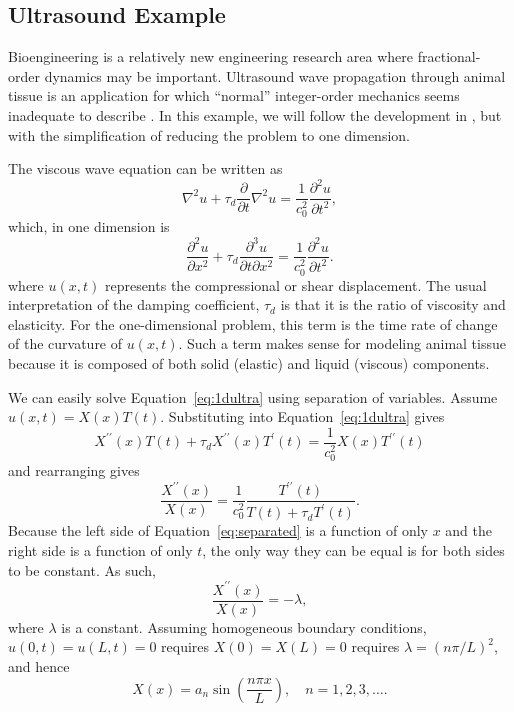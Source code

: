 \subsection{Ultrasound Example}

Bioengineering is a relatively new engineering research area where fractional-order dynamics may be important. Ultrasound wave propagation through animal tissue is an application for which ``normal'' integer-order mechanics seems inadequate to describe \cite{holm}. In this example, we will follow the development in \cite{holm}, but with the simplification of reducing the problem to one dimension.

The viscous wave equation can be written as
\begin{equation}
\nabla^2 u + \tau_d \frac{\partial}{\partial t} \nabla^2 u = \frac{1}{c_0^2} \frac{\partial^2 u}{\partial t^2},
\end{equation}
which, in one dimension is
\begin{equation}
\frac{\partial^2 u}{\partial x^2} + \tau_d \frac{\partial^3 u}{\partial t \partial x^2} =  \frac{1}{c_0^2} \frac{\partial^2 u}{\partial t^2}.
\label{eq:1dultra}
\end{equation}
where $u(x,t)$ represents the compressional or shear displacement. The usual interpretation of the damping coefficient, $\tau_d$ is that it is the ratio of viscosity and elasticity. For the one-dimensional problem, this term is the time rate of change of the curvature of $u(x,t)$. Such a term makes sense for modeling animal tissue because it is composed of both solid (elastic) and liquid (viscous) components.

We can easily solve Equation~\ref{eq:1dultra} using separation of variables. Assume $u(x,t) = X(x) T(t)$. Substituting into Equation~\ref{eq:1dultra} gives
\[
X^{\prime \prime}(x) T(t) + \tau_d X^{\prime \prime}(x) T^{\prime}(t) = \frac{1}{c_0^2} X(x) T^{\prime \prime}(t)
\]
and rearranging gives
\begin{equation}
\frac{X^{\prime \prime}(x)}{X(x)} = \frac{1}{c_0^2} \frac{T^{\prime \prime}(t)}{T(t) + \tau_d T^{\prime}(t)}.
\label{eq:separated}
\end{equation}
Because the left side of Equation~\ref{eq:separated} is a function of only $x$ and the right side is a function of only $t$, the only way they can be equal is for both sides to be constant. As such,
\[
\frac{X^{\prime \prime}(x)}{X(x)} = -\lambda,
\]
where $\lambda$ is a constant. Assuming homogeneous boundary conditions, $u(0,t) = u(L,t) = 0$ requires $X(0) = X(L) = 0$ requires $\lambda = \left( n \pi/L \right)^2$, and hence
\begin{equation}
X(x) = a_n \sin \left( \frac{n \pi x}{L} \right), \quad n = 1, 2, 3, \ldots.
\end{equation}

